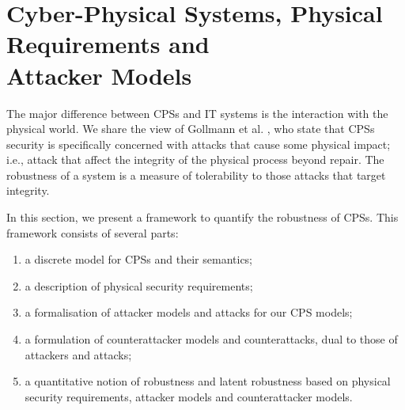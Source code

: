 \section{Cyber-Physical Systems, Physical Requirements and \\Attacker Models}
The major difference between CPSs and IT systems is the interaction with the physical world. We share the view of Gollmann et al. \cite{CPSSecVinyl}, who state that CPSs security is {specifically} concerned with attacks that cause some physical impact; i.e., attack that affect the integrity of the physical process beyond repair. The robustness of a system is a measure of tolerability to those attacks that target integrity. 

In this section, we present a framework to quantify the robustness of CPSs. This framework consists of several parts:
\begin{enumerate}
  \item a discrete model for CPSs and their semantics; 
  \item a description of physical security requirements;
  \item a formalisation of attacker models and attacks for our CPS models;
  \item a formulation of counterattacker models and counterattacks, dual to those of attackers and attacks;
  \item a quantitative notion of robustness and latent robustness based on physical security requirements, attacker models and counterattacker models.
\end{enumerate}


